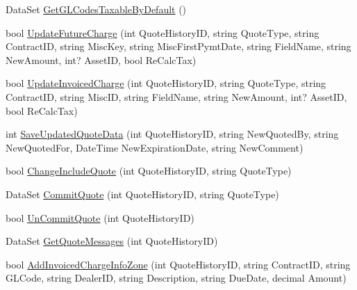 \begin{DoxyCompactItemize}
\item 
Data\+Set \mbox{\hyperlink{class_g_f_s_c_1_1_services_1_1_end_of_term_1_1_end_of_term_service_a121a81c4e4bcaa1d9e77609883af1278}{Get\+G\+L\+Codes\+Taxable\+By\+Default}} ()
\item 
bool \mbox{\hyperlink{class_g_f_s_c_1_1_services_1_1_end_of_term_1_1_end_of_term_service_a92d301736a442fc1a6ca7e8286886b66}{Update\+Future\+Charge}} (int Quote\+History\+ID, string Quote\+Type, string Contract\+ID, string Misc\+Key, string Misc\+First\+Pymt\+Date, string Field\+Name, string New\+Amount, int? Asset\+ID, bool Re\+Calc\+Tax)
\item 
bool \mbox{\hyperlink{class_g_f_s_c_1_1_services_1_1_end_of_term_1_1_end_of_term_service_a35b67c3866fe5c8dbe98540fe668238b}{Update\+Invoiced\+Charge}} (int Quote\+History\+ID, string Quote\+Type, string Contract\+ID, string Misc\+ID, string Field\+Name, string New\+Amount, int? Asset\+ID, bool Re\+Calc\+Tax)
\item 
int \mbox{\hyperlink{class_g_f_s_c_1_1_services_1_1_end_of_term_1_1_end_of_term_service_ae32d61b9602017ad2246831d6c060a87}{Save\+Updated\+Quote\+Data}} (int Quote\+History\+ID, string New\+Quoted\+By, string New\+Quoted\+For, Date\+Time New\+Expiration\+Date, string New\+Comment)
\item 
bool \mbox{\hyperlink{class_g_f_s_c_1_1_services_1_1_end_of_term_1_1_end_of_term_service_a8347b6e637bf8a074ca4a45cc602610b}{Change\+Include\+Quote}} (int Quote\+History\+ID, string Quote\+Type)
\item 
Data\+Set \mbox{\hyperlink{class_g_f_s_c_1_1_services_1_1_end_of_term_1_1_end_of_term_service_a3bfa8906863b8fab10ab0222571ec053}{Commit\+Quote}} (int Quote\+History\+ID, string Quote\+Type)
\item 
bool \mbox{\hyperlink{class_g_f_s_c_1_1_services_1_1_end_of_term_1_1_end_of_term_service_a5b4aae2fc91d5d76873fa5fad53ce4e2}{Un\+Commit\+Quote}} (int Quote\+History\+ID)
\item 
Data\+Set \mbox{\hyperlink{class_g_f_s_c_1_1_services_1_1_end_of_term_1_1_end_of_term_service_a536e36fbecb81cb807ed66b50f3e801d}{Get\+Quote\+Messages}} (int Quote\+History\+ID)
\item 
bool \mbox{\hyperlink{class_g_f_s_c_1_1_services_1_1_end_of_term_1_1_end_of_term_service_a87e17fb4369ea5eaf12dfe516c551fd2}{Add\+Invoiced\+Charge\+Info\+Zone}} (int Quote\+History\+ID, string Contract\+ID, string G\+L\+Code, string Dealer\+ID, string Description, string Due\+Date, decimal Amount)
\item 

\end{DoxyCompactItemize}

